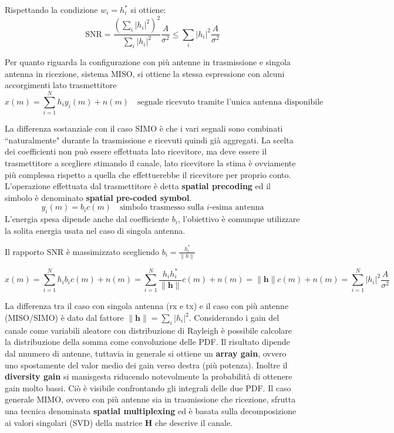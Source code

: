 Rispettando la condizione $w_i = h_i^*$ si ottiene:
\[
    \text{SNR} = \frac{\left(\sum_{i} \left| h_i \right|^2 \right)^2}{\sum_{i} |h_i|^2} \frac{A}{\sigma ^2} \leq \sum_{i} |h_i|^2 \frac{A}{\sigma^2}
\]


Per quanto riguarda la configurazione con più antenne in trasmissione e singola antenna in ricezione, sistema MISO, si ottiene la stessa espressione con alcuni accorgimenti lato trasmettitore
\[
    x(m) = \sum_{i=1}^{N} h_i y_i(m) + n(m) \quad \text{segnale ricevuto tramite l'unica antenna disponibile}
\]


La differenza sostanziale con il caso SIMO è che i vari segnali sono combinati ``naturalmente" durante la trasmissione e ricevuti quindi già aggregati. 
La scelta dei coefficienti non può essere effettuata lato ricevitore, ma deve essere il trasmettitore a scegliere stimando il canale, lato ricevitore la stima è ovviamente più complessa rispetto a quella che effettuerebbe il ricevitore per proprio conto.
L'operazione effettuata dal trasmettitore è detta \textbf{spatial precoding} ed il simbolo è denominato \textbf{spatial pre-coded symbol}.
\[
    y_i(m) = b_i c(m) \quad \text{simbolo trasmesso sulla $i$-esima antenna}
\]
L'energia spesa dipende anche dal coefficiente $b_i$, l'obiettivo è comunque utilizzare la solita energia usata nel caso di singola antenna.

Il rapporto SNR è massimizzato scegliendo $b_i = \frac{h_i^*}{ \| h \| }$

\[
    x(m) = \sum_{i=1}^{N} h_i b_i c(m) + n(m) = \sum_{i=1}^{N} \frac{h_i h_i^*}{\| \mathbf{h} \|} c(m) + n(m) = \| \mathbf{h} \| c(m) + n(m) = \sum_{i=1}^{N} |h_i|^2 \frac{A}{\sigma^2}
\]

La differenza tra il caso con singola antenna (rx e tx) e il caso con più antenne (MISO/SIMO) è dato dal fattore $\| \mathbf{h} \| = \sum_{i} |h_i|^2$.
Considerando i gain del canale come variabili aleatore con distribuzione di Rayleigh è possibile calcolare la distribuzione della somma come convoluzione delle PDF.
Il risultato dipende dal nnumero di antenne, tuttavia in generale si ottiene un \textbf{array gain}, ovvero uno spostamente del valor medio dei gain verso destra (più potenza). Inoltre il \textbf{diversity gain} si manisgesta riducendo notevolmente la probabilità di ottenere gain molto bassi. Ciò è visibile confrontando gli integrali delle due PDF.
Il caso generale MIMO, ovvero con più antenne sia in trasmissione che ricezione, sfrutta una tecnica denominata \textbf{spatial multiplexing} ed è basata sulla decomposizione ai valori singolari (SVD) della matrice $\mathbf{H}$ che descrive il canale.

